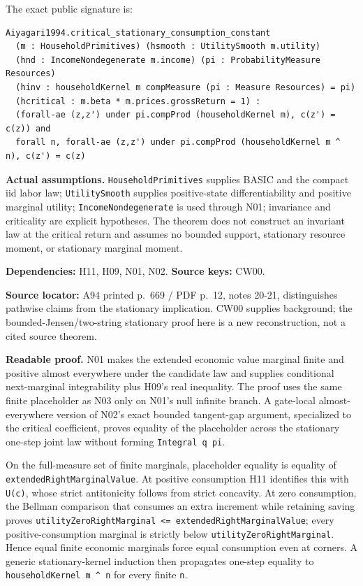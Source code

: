 \documentclass[
  11pt,
]{article}
\let\LedgerOriginalTexttt\texttt
\renewcommand{\texttt}[1]{{\small\LedgerOriginalTexttt{#1}}}
\begin{document}
The exact public signature is:

\begin{verbatim}
Aiyagari1994.critical_stationary_consumption_constant
  (m : HouseholdPrimitives) (hsmooth : UtilitySmooth m.utility)
  (hnd : IncomeNondegenerate m.income) (pi : ProbabilityMeasure Resources)
  (hinv : householdKernel m compMeasure (pi : Measure Resources) = pi)
  (hcritical : m.beta * m.prices.grossReturn = 1) :
  (forall-ae (z,z') under pi.compProd (householdKernel m), c(z') = c(z)) and
  forall n, forall-ae (z,z') under pi.compProd (householdKernel m ^ n), c(z') = c(z)
\end{verbatim}

\textbf{Actual assumptions.} \texttt{HouseholdPrimitives} supplies BASIC
and the compact iid labor law; \texttt{UtilitySmooth} supplies
positive-state differentiability and positive marginal utility;
\texttt{IncomeNondegenerate} is used through N01; invariance and
criticality are explicit hypotheses. The theorem does not construct an
invariant law at the critical return and assumes no bounded support,
stationary resource moment, or stationary marginal moment.

\textbf{Dependencies:} H11, H09, N01, N02. \textbf{Source keys:} CW00.

\textbf{Source locator:} A94 printed p.~669 / PDF p.~12, notes 20-21,
distinguishes pathwise claims from the stationary implication. CW00
supplies background; the bounded-Jensen/two-string stationary proof here
is a new reconstruction, not a cited source theorem.

\textbf{Readable proof.} N01 makes the extended economic value marginal
finite and positive almost everywhere under the candidate law and
supplies conditional next-marginal integrability plus H09's real
inequality. The proof uses the same finite placeholder as N03 only on
N01's null infinite branch. A gate-local almost-everywhere version of
N02's exact bounded tangent-gap argument, specialized to the critical
coefficient, proves equality of the placeholder across the stationary
one-step joint law without forming \texttt{Integral\ q\ pi}.

On the full-measure set of finite marginals, placeholder equality is
equality of \texttt{extendedRightMarginalValue}. At positive consumption
H11 identifies this with \texttt{U\textquotesingle{}(c)}, whose strict
antitonicity follows from strict concavity. At zero consumption, the
Bellman comparison that consumes an extra increment while retaining
saving proves
\texttt{utilityZeroRightMarginal\ \textless{}=\ extendedRightMarginalValue};
every positive-consumption marginal is strictly below
\texttt{utilityZeroRightMarginal}. Hence equal finite economic marginals
force equal consumption even at corners. A generic stationary-kernel
induction then propagates one-step equality to
\texttt{householdKernel\ m\ \^{}\ n} for every finite \texttt{n}.
\end{document}
